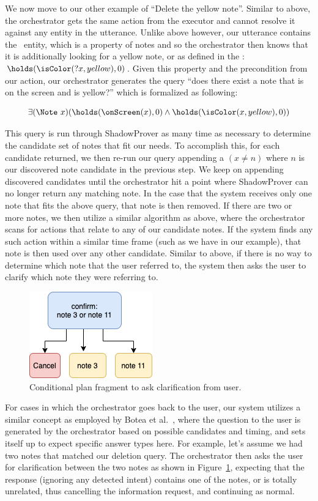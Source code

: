 We now move to our other example of ``Delete the yellow note''. Similar to above, the orchestrator
gets the same action from the executor and cannot resolve it against any entity in the utterance.
Unlike above however, our utterance contains the \Color\ entity, which is a property of notes and so the
orchestrator then knows that it is additionally looking for a yellow note, or as defined in the
\CEC: $\holds(\isColor(?x, yellow), 0)$. Given this property and the precondition from our action,
our orchestrator generates the query ``does there exist a note that is on the screen and is
yellow?'' which is formalized as following:

\begin{equation*}
    \exists (\Note\ x) (\holds(\onScreen(x), 0) \land \holds(\isColor(x, yellow), 0))
\end{equation*}

This query is run through \textsf{ShadowProver} as many time as necessary to determine
the candidate set of notes that fit our needs. To accomplish this, for each candidate
returned, we then re-run our query appending a $(x \neq n)$ where $n$ is our discovered
note candidate in the previous step. We keep on appending discovered candidates until the orchestrator
hit a point where \textsf{ShadowProver} can no longer return any matching note. In the case
that the system receives only one note that fits the above query, that note is then removed.
If there are two or more notes, we then utilize a similar algorithm as above, where the
orchestrator scans for actions that relate to any of our candidate notes. If the system
finds any such action within a similar time frame (such as we have in our example), that note
is then used over any other candidate. Similar to above, if there is no way to determine
which note that the user referred to, the system then asks the user to clarify which
note they were referring to.

\begin{figure}
\centering
  \includegraphics[width=0.3\columnwidth]{chapters/06_planning/figures/intent_resolution_fragment.png}
  \caption{Conditional plan fragment to ask clarification from user.}
  \label{fig:intent_resolution_fragment}
\end{figure}

For cases in which the orchestrator goes back to the user, our system utilizes a similar concept
as employed by Botea et al.~\cite{botea_generating_2019}, where the question to the user
is generated by the orchestrator based on possible candidates and timing, and sets itself up
to expect specific answer types here. For example, let's assume we had two notes that matched
our deletion query. The orchestrator then asks the user for clarification between the two notes
as shown in Figure~\ref{fig:intent_resolution_fragment}, expecting that the response (ignoring
any detected intent) contains one of the notes, or is totally unrelated, thus cancelling the
information request, and continuing as normal.
